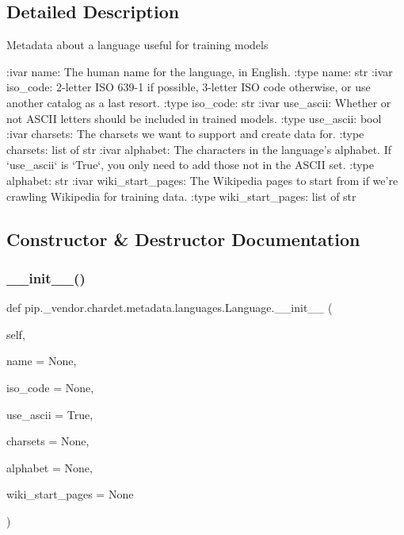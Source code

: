 \subsection{Detailed Description}
\begin{DoxyVerb}Metadata about a language useful for training models

:ivar name: The human name for the language, in English.
:type name: str
:ivar iso_code: 2-letter ISO 639-1 if possible, 3-letter ISO code otherwise,
                or use another catalog as a last resort.
:type iso_code: str
:ivar use_ascii: Whether or not ASCII letters should be included in trained
                 models.
:type use_ascii: bool
:ivar charsets: The charsets we want to support and create data for.
:type charsets: list of str
:ivar alphabet: The characters in the language's alphabet. If `use_ascii` is
                `True`, you only need to add those not in the ASCII set.
:type alphabet: str
:ivar wiki_start_pages: The Wikipedia pages to start from if we're crawling
                        Wikipedia for training data.
:type wiki_start_pages: list of str
\end{DoxyVerb}
 

\subsection{Constructor \& Destructor Documentation}
\mbox{\label{classpip_1_1__vendor_1_1chardet_1_1metadata_1_1languages_1_1Language_ae8dd610b8889c18351d4dbde869ca0b2}} 
\subsubsection{\texorpdfstring{\+\_\+\+\_\+init\+\_\+\+\_\+()}{\_\_init\_\_()}}
{\footnotesize\ttfamily def pip.\+\_\+vendor.\+chardet.\+metadata.\+languages.\+Language.\+\_\+\+\_\+init\+\_\+\+\_\+ (\begin{DoxyParamCaption}\item[{}]{self,  }\item[{}]{name = {\ttfamily None},  }\item[{}]{iso\+\_\+code = {\ttfamily None},  }\item[{}]{use\+\_\+ascii = {\ttfamily True},  }\item[{}]{charsets = {\ttfamily None},  }\item[{}]{alphabet = {\ttfamily None},  }\item[{}]{wiki\+\_\+start\+\_\+pages = {\ttfamily None} }\end{DoxyParamCaption})}



